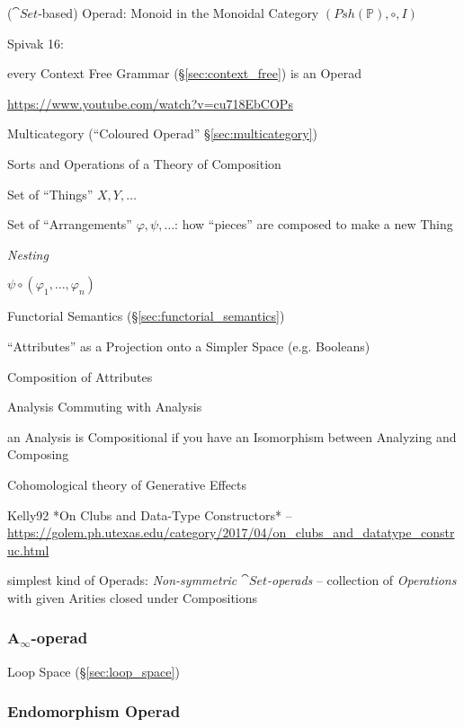 ($\cat{Set}$-based) Operad: Monoid in the Monoidal Category
$(Psh(\mathbb{P}), \circ, I)$ %

Spivak 16:

every Context Free Grammar (\S\ref{sec:context_free}) is an Operad

\url{https://www.youtube.com/watch?v=cu718EbCOPs}


Multicategory (``Coloured Operad'' \S\ref{sec:multicategory})

Sorts and Operations of a Theory of Composition

Set of ``Things'' $X,Y,\ldots$

Set of ``Arrangements'' $\varphi,\psi,\ldots$: how ``pieces'' are
composed to make a new Thing

\emph{Nesting}

$\psi \circ (\varphi_1, \ldots, \varphi_n)$

Functorial Semantics (\S\ref{sec:functorial_semantics})

``Attributes'' as a Projection onto a Simpler Space (e.g. Booleans)

Composition of Attributes

Analysis Commuting with Analysis

an Analysis is Compositional if you have an Isomorphism between
Analyzing and Composing

Cohomological theory of Generative Effects


Kelly92 *On Clubs and Data-Type Constructors* --
\url{https://golem.ph.utexas.edu/category/2017/04/on_clubs_and_datatype_construc.html}

simplest kind of Operads: \emph{Non-symmetric $\cat{Set}$-operads} --
collection of \emph{Operations} with given Arities closed under
Compositions



\subsubsection{A$_\infty$-operad}\label{sec:a_infinity_operad}

Loop Space (\S\ref{sec:loop_space})



\subsubsection{Endomorphism Operad}\label{sec:endomorphism_operad}

